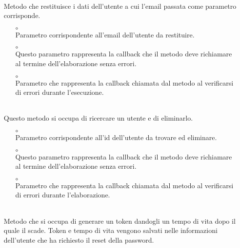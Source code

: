 \begin{itemize}
\item[]  \\ Metodo che restituisce i dati dell'utente a cui l'email passata come parametro corrisponde.
\begin{itemize}\addtolength{\itemsep}{-0.5\baselineskip}
\item[$\circ$]  \\ Parametro corrispondente all'email dell'utente da restituire.
\item[$\circ$]  \\ Questo parametro rappresenta la callback che il metodo deve richiamare al termine dell'elaborazione senza errori.
\item[$\circ$]  \\ Parametro che rappresenta la callback chiamata dal metodo al verificarsi di errori durante l'esecuzione.
\end{itemize}
\item[]  \\ Questo metodo si occupa di ricercare un utente e di eliminarlo.
\begin{itemize}\addtolength{\itemsep}{-0.5\baselineskip}
\item[$\circ$]  \\ Parametro corrispondente all'id dell'utente da trovare ed eliminare.
\item[$\circ$]  \\ Questo parametro rappresenta la callback che il metodo deve richiamare al termine dell'elaborazione senza errori.
\item[$\circ$]  \\ Parametro che rappresenta la callback chiamata dal metodo al verificarsi di errori durante l'elaborazione.
\end{itemize}
\item[]  \\ Metodo che si occupa di generare un token dandogli un tempo di vita dopo il quale il scade. Token e tempo di vita vengono salvati nelle informazioni dell'utente che ha richiesto il reset della password.

\end{itemize}
